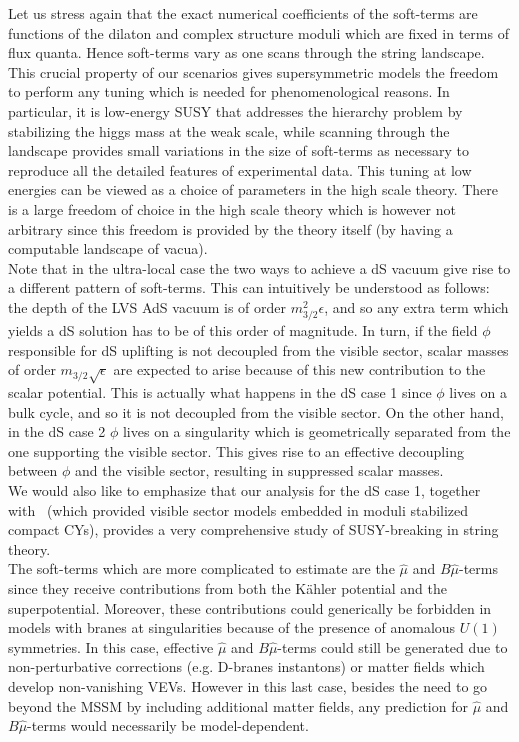\documentclass[12pt,a4paper]{book}
\begin{document}
Let us stress again that the exact numerical coefficients of the soft-terms are functions of the dilaton and complex structure moduli which are fixed in terms of flux quanta. Hence soft-terms vary as one scans through the string landscape. This crucial property of our scenarios gives supersymmetric models the freedom to perform any tuning which is needed for phenomenological reasons. In particular, it is low-energy SUSY that addresses the hierarchy problem by stabilizing the higgs mass at the weak scale, while scanning through the landscape provides small variations in the size of soft-terms as necessary to reproduce all the detailed features of experimental data. This tuning at low energies can be viewed as a choice of parameters in the high scale theory. There is a large freedom of choice in the high scale theory which is however not arbitrary since this freedom is provided by the theory itself (by having a computable landscape of vacua).\\

Note that in the ultra-local case the two ways to achieve a dS vacuum give rise to a different pattern of soft-terms. This can intuitively be understood as follows: the depth of the LVS AdS vacuum is of order $m_{3/2}^2\epsilon$, and so any extra term which yields a dS solution has to be of this order of magnitude. In turn, if the field $\phi$ responsible for dS uplifting is not decoupled from the visible sector, scalar masses of order $m_{3/2} \sqrt{\epsilon}$ are expected to arise because of this new contribution to the scalar potential. This is actually what happens in the dS case 1 since $\phi$ lives on a bulk cycle, and so it is not decoupled from the visible sector. On the other hand, in the dS case 2 $\phi$ lives on a singularity which is geometrically separated from the one supporting the visible sector. This gives rise to an effective decoupling between $\phi$ and the visible sector, resulting in suppressed scalar masses.\\

We would also like to emphasize that our analysis for the dS case 1, together with~\cite{Cicoli:2012vw}
(which provided visible sector models embedded in moduli stabilized compact CYs), provides a very comprehensive study of SUSY-breaking in string theory.\\

The soft-terms which are more complicated to estimate are the $\hat{\mu}$ and $B\hat{\mu}$-terms since they receive contributions from both the K\"ahler potential and the superpotential. Moreover, these contributions could generically be forbidden in models with branes at singularities because of the presence of anomalous $U(1)$ symmetries. In this case, effective $\hat{\mu}$ and $B\hat{\mu}$-terms could still be generated due to non-perturbative corrections (e.g. D-branes instantons) or matter fields which develop non-vanishing VEVs. However in this last case, besides the need to go beyond the MSSM by including additional matter fields, any prediction for $\hat{\mu}$ and $B\hat{\mu}$-terms would necessarily be model-dependent.
\end{document}
